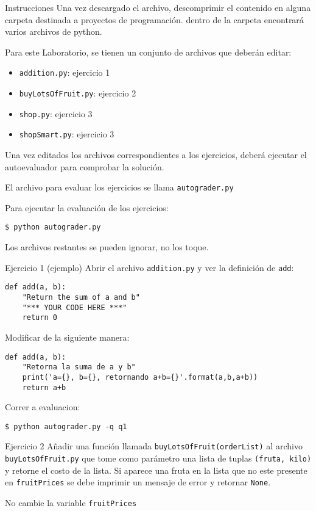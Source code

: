 \documentclass[10pt]{beamer}
\begin{document}
\begin{frame}{Instrucciones}
Una vez descargado el archivo, descomprimir el contenido en alguna carpeta destinada a 
proyectos de programación. dentro de la carpeta encontrará varios archivos de python.

Para este Laboratorio, se tienen un conjunto de archivos que deberán editar:
\begin{itemize}
    \item \texttt{addition.py}: ejercicio 1
    \item \texttt{buyLotsOfFruit.py}: ejercicio 2
    \item \texttt{shop.py}: ejercicio 3
    \item \texttt{shopSmart.py}: ejercicio 3
\end{itemize}
Una vez editados los archivos correspondientes a los ejercicios, deberá ejecutar el autoevaluador 
para comprobar la solución.

El archivo para evaluar los ejercicios se llama \texttt{autograder.py}

Para ejecutar la evaluación de los ejercicios:
\begin{lstlisting}
$ python autograder.py
\end{lstlisting}
Los archivos restantes se pueden ignorar, no los toque.

\end{frame}

\begin{frame}{Ejercicio 1 (ejemplo)}
Abrir el archivo \texttt{addition.py} y ver la definición de \texttt{add}:
\begin{lstlisting}
def add(a, b):
    "Return the sum of a and b"
    "*** YOUR CODE HERE ***"
    return 0
\end{lstlisting}
Modificar de la siguiente manera:
\begin{lstlisting}
def add(a, b):
    "Retorna la suma de a y b"
    print('a={}, b={}, retornando a+b={}'.format(a,b,a+b))
    return a+b
\end{lstlisting}
Correr a evaluacion:
\begin{lstlisting}
$ python autograder.py -q q1
\end{lstlisting}
\end{frame}



\begin{frame}[fragile]{Ejercicio 2}
Añadir una función llamada \texttt{buyLotsOfFruit(orderList)} al archivo \texttt{buyLotsOfFruit.py}
que tome como parámetro una lista de tuplas \texttt{(fruta, kilo)} y retorne el costo 
de la lista. Si aparece una fruta en la lista que no este presente en \texttt{fruitPrices} se debe 
imprimir un mensaje de error y retornar \texttt{None}. 

No cambie la variable \texttt{fruitPrices}
\end{frame}
\end{document}
